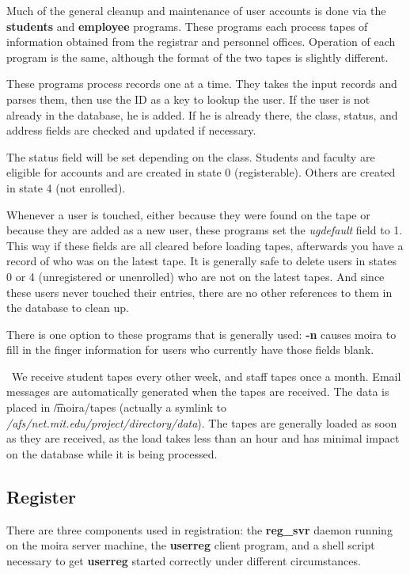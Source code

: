 Much of the general cleanup and maintenance of user accounts is done
via the {\bf students} and {\bf employee} programs.  These programs each
process tapes of information obtained from the registrar and personnel
offices.  Operation of each program is the same, although the format
of the two tapes is slightly different.

These programs process records one at a time.  They takes the input
records and parses them, then use the ID as a key to lookup the user.
If the user is not already in the database, he is added.  If he is
already there, the class, status, and address fields are checked and
updated if necessary.

The status field will be set depending on the class.  Students and
faculty are eligible for accounts and are created in state 0
(registerable).  Others are created in state 4 (not enrolled).

Whenever a user is touched, either because they were found on the tape
or because they are added as a new user, these programs set the
{\em ugdefault} field to 1.  This way if these fields are all cleared
before loading tapes, afterwards you have a record of who was on the
latest tape.  It is generally safe to delete users in states 0 or 4
(unregistered or unenrolled) who are not on the latest tapes.  And
since these users never touched their entries, there are no other
references to them in the database to clean up.

There is one option to these programs that is generally used:
{\bf -n} causes moira to fill in the finger information for users who
currently have those fields blank.

\athena\ We receive student tapes every other week, and staff tapes
once a month.  Email messages are automatically generated when the
tapes are received.  The data is placed in {\t /moira/tapes} (actually
a symlink to {\it /afs/net.mit.edu/project/directory/data}).  The
tapes are generally loaded as soon as they are received, as the load
takes less than an hour and has minimal impact on the database while
it is being processed.

\subsection{Register}

There are three components used in registration: the {\bf reg\_svr}
daemon running on the moira server machine, the {\bf userreg} client
program, and a shell script necessary to get {\bf userreg} started
correctly under different circumstances. 

